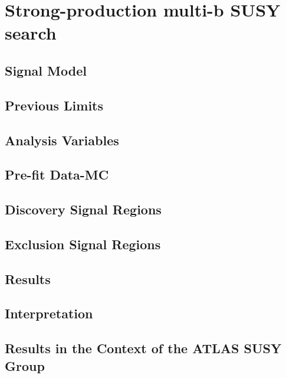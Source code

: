 \chapter{Strong-production multi-b SUSY search}
\label{chap:strong_prod}


\section{Signal Model}

\section{Previous Limits}

\section{Analysis Variables}


\section{Pre-fit Data-MC}


\section{Discovery Signal Regions}


\section{Exclusion Signal Regions}


\section{Results}


\section{Interpretation}

\section{Results in the Context of the ATLAS SUSY Group}